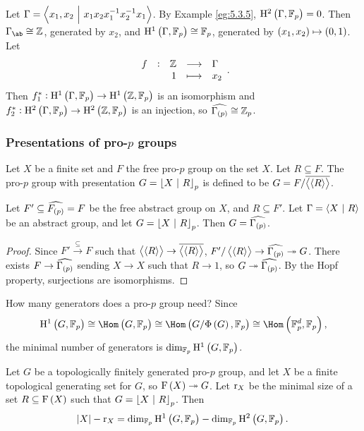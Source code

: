 \begin{example}
Let $ \Gamma = \left\langle x_1, x_2 \ \middle| \  x_1x_2x_1^{-1}x_2^{-1}x_1 \right\rangle $. By Example \ref{eg:5.3.5}, $ \H^2\br{\Gamma, \FF_p} = 0 $. Then $ \Gamma_{\ab} \cong \ZZ $, generated by $ x_2 $, and $ \H^1\br{\Gamma, \FF_p} \cong \FF_p $, generated by $ \br{x_1, x_2} \mapsto \br{0, 1} $. Let
$$ \function[f]{\ZZ}{\Gamma}{1}{x_2}. $$
Then $ f_1^* : \H^1\br{\Gamma, \FF_p} \to \H^1\br{\ZZ, \FF_p} $ is an isomorphism and $ f_2^* : \H^2\br{\Gamma, \FF_p} \to \H^2\br{\ZZ, \FF_p} $ is an injection, so $ \widehat{\Gamma_{\br{p}}} \cong \ZZ_p $.
\end{example}

\pagebreak

\subsubsection{Presentations of pro-\texorpdfstring{$ p $}{p} groups}

\begin{definition}
Let $ X $ be a finite set and $ F $ the free pro-$ p $ group on the set $ X $. Let $ R \subseteq F $. The pro-$ p $ group with presentation $ G = \left\lfloor X \ \middle| \  R \right\rfloor_p $ is defined to be $ G = F / \overline{\left\langle \left\langle R \right\rangle \right\rangle} $.
\end{definition}

\begin{lemma}
Let $ F' \subseteq \widehat{F_{\br{p}}} = F $ be the free abstract group on $ X $, and $ R \subseteq F' $. Let $ \Gamma = \left\langle X \ \middle| \  R \right\rangle $ be an abstract group, and let $ G = \left\lfloor X \ \middle| \  R \right\rfloor_p $. Then $ G = \widehat{\Gamma_{\br{p}}} $.
\end{lemma}

\begin{proof}
Since $ F' \xrightarrow{\subseteq} F $ such that $ \left\langle \left\langle R \right\rangle \right\rangle \to \overline{\left\langle \left\langle R \right\rangle \right\rangle} $, $ F' / \abr{\abr{R}} \to \widehat{\Gamma_{\br{p}}} \twoheadrightarrow G $. There exists $ F \to \widehat{\Gamma_{\br{p}}} $ sending $ X \to X $ such that $ R \to 1 $, so $ G \twoheadrightarrow \widehat{\Gamma_{\br{p}}} $. By the Hopf property, surjections are isomorphisms.
\end{proof}

How many generators does a pro-$ p $ group need? Since
$$ \H^1\br{G, \FF_p} \cong \Hom\br{G, \FF_p} \cong \Hom\br{G / \Phi\br{G}, \FF_p} \cong \Hom\br{\FF_p^d, \FF_p}, $$
the minimal number of generators is $ \dim_{\FF_p} \H^1\br{G, \FF_p} $.

\begin{theorem}
\label{thm:5.4.28}
Let $ G $ be a topologically finitely generated pro-$ p $ group, and let $ X $ be a finite topological generating set for $ G $, so $ \F\br{X} \twoheadrightarrow G $. Let $ \mathrm{r}_X $ be the minimal size of a set $ R \subseteq \F\br{X} $ such that $ G = \left\lfloor X \ \middle| \  R \right\rfloor_p $. Then
$$ \abs{X} - \r_X = \dim_{\FF_p} \H^1\br{G, \FF_p} - \dim_{\FF_p} \H^2\br{G, \FF_p}. $$
\end{theorem}


